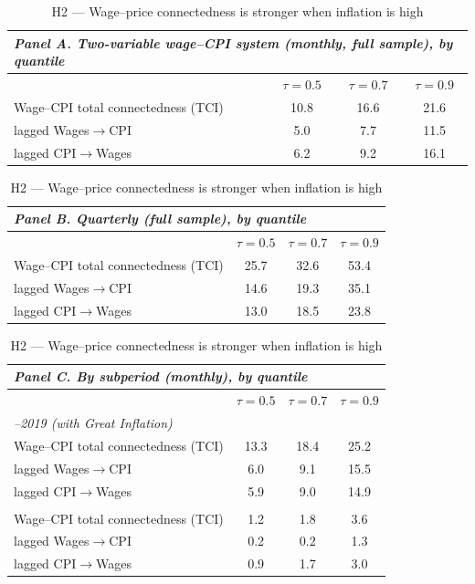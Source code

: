 \begin{table}[!ht]
\centering
\caption{H2 --- Wage--price connectedness is stronger when inflation is high}
\label{tab:h2}
\setlength{\tabcolsep}{6pt}\footnotesize
\begin{threeparttable}
\begin{tabular}{l c c c}
\multicolumn{4}{l}{\textit{Panel A. Two-variable wage--CPI system (monthly, full sample), by quantile}}\\
\toprule
 & $\tau=0.5$ & $\tau=0.7$ & $\tau=0.9$ \\
\midrule
Wage--CPI total connectedness (TCI) & 10.8 & 16.6 & 21.6 \\
\quad lagged Wages$\to$CPI & 5.0 & 7.7 & 11.5 \\
\quad lagged CPI$\to$Wages & 6.2 & 9.2 & 16.1 \\
\bottomrule
\end{tabular}

\vspace{4pt}
\begin{tabular}{l c c c}
\multicolumn{4}{l}{\textit{Panel B. Quarterly (full sample), by quantile}}\\
\toprule
 & $\tau=0.5$ & $\tau=0.7$ & $\tau=0.9$ \\
\midrule
Wage--CPI total connectedness (TCI) & 25.7 & 32.6 & 53.4 \\
\quad lagged Wages$\to$CPI & 14.6 & 19.3 & 35.1 \\
\quad lagged CPI$\to$Wages & 13.0 & 18.5 & 23.8 \\
\bottomrule
\end{tabular}

\vspace{4pt}
\begin{tabular}{l c c c}
\multicolumn{4}{l}{\textit{Panel C. By subperiod (monthly), by quantile}}\\
\toprule
 & $\tau=0.5$ & $\tau=0.7$ & $\tau=0.9$ \\
\midrule
\multicolumn{4}{l}{\textit{\;1964--2019 (with Great Inflation)}}\\
Wage--CPI total connectedness (TCI) & 13.3 & 18.4 & 25.2 \\
\quad lagged Wages$\to$CPI & 6.0 & 9.1 & 15.5 \\
\quad lagged CPI$\to$Wages & 5.9 & 9.0 & 14.9 \\
\addlinespace
\multicolumn{4}{l}{\textit{\;1983--2026 (post-Great-Inflation)}}\\
Wage--CPI total connectedness (TCI) & 1.2 & 1.8 & 3.6 \\
\quad lagged Wages$\to$CPI & 0.2 & 0.2 & 1.3 \\
\quad lagged CPI$\to$Wages & 0.9 & 1.7 & 3.0 \\
\bottomrule
\end{tabular}


\end{threeparttable}
\end{table}
